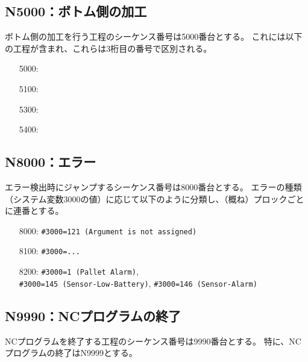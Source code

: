 \clearpage
\subsection{N5000：ボトム側の加工}
ボトム側の加工を行う工程のシーケンス番号は5000番台とする。
これには以下の工程が含まれ、これらは3桁目の番号で区別される。
\begin{enumerate}
\item[5000:] \BottomEndFacecutMilling
\item[5100:] \BottomOutcutMilling
\item[5300:] \BottomEndFaceOutCChamferMilling
\item[5400:] \BottomEndFaceInCChamferMilling
\end{enumerate}


\subsection{N8000：エラー\label{subsec:sequenceNerror}\vphantom{\ref{subsec:sequenceNerror}}\TBW}
エラー検出時にジャンプするシーケンス番号は8000番台とする。
エラーの種類（システム変数\ttNum3000の値）に応じて以下のように分類し、（概ね）プロックごとに連番とする。
\begin{enumerate}
\item[8000:] \verb|#3000=121 (Argument is not assigned)|
\item[8100:] \verb|#3000=...|
\item[8200:] \verb|#3000=1 (Pallet Alarm)|,\\
            \verb|#3000=145 (Sensor-Low-Battery)|, \verb|#3000=146 (Sensor-Alarm)|
\end{enumerate}


\subsection{N9990：NCプログラムの終了\label{subsec:sequenceNprgEnd}}
NCプログラムを終了する工程のシーケンス番号は9990番台とする。
特に、NCプログラムの終了はN9999とする。



